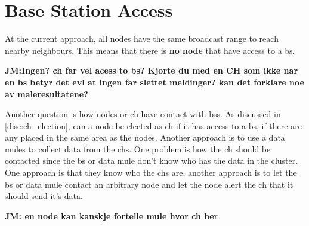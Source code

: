 \documentclass[USenglish]{uit-thesis}
\begin{document}




\section{Base Station Access} \label{disc:bs_acc}
At the current approach, all nodes have the same broadcast range to reach nearby neighbours. This means that there is \textbf{no node} that have access to a \gls{bs}.

\textbf{JM:Ingen? ch far vel acess to bs? Kjorte du med en CH som ikke nar en bs betyr det evl at ingen far slettet meldinger? kan det forklare noe av maleresultatene?}


Another question is how nodes or \gls{ch} have contact with \glspl{bs}. As discussed in \autoref{disc:ch_election}, can a node be elected as \gls{ch} if it has access to a \gls{bs}, if there are any placed in the same area as the nodes. Another approach is to use a data mules to collect data from the \glspl{ch}.
One problem is how the \gls{ch} should be contacted since the \gls{bs} or data mule don't know who has the data in the cluster. One approach is that they know who the \glspl{ch} are, another approach is to let the \gls{bs} or data mule contact an arbitrary node and let the node alert the \gls{ch} that it should send it's data.

\textbf{JM: en node kan kanskje fortelle mule hvor ch her}




\end{document}
